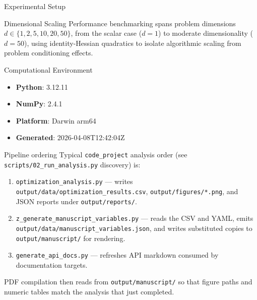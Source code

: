\documentclass[
  ignorenonframetext,
]{beamer}
\providecommand{\tightlist}{%
  \setlength{\itemsep}{0pt}\setlength{\parskip}{0pt}}
\begin{document}
\begin{frame}[fragile]{Experimental Setup}
\begin{block}{Dimensional Scaling}
\protect{}\label{dimensional-scaling}
Performance benchmarking spans problem dimensions
\(d \in \{1, 2, 5, 10, 20, 50\}\), from the scalar case (\(d = 1\)) to
moderate dimensionality (\(d = 50\)), using identity-Hessian quadratics
to isolate algorithmic scaling from problem conditioning effects.
\end{block}

\begin{block}{Computational Environment}
\protect{}\label{computational-environment}
\begin{itemize}
\tightlist
\item
  \textbf{Python}: 3.12.11
\item
  \textbf{NumPy}: 2.4.1
\item
  \textbf{Platform}: Darwin arm64
\item
  \textbf{Generated}: 2026-04-08T12:42:04Z
\end{itemize}
\end{block}

\begin{block}{Pipeline ordering}
\protect{}\label{pipeline-ordering}
Typical \texttt{code\_project} analysis order (see
\texttt{scripts/02\_run\_analysis.py} discovery) is:

\begin{enumerate}
\tightlist
\item
  \texttt{optimization\_analysis.py} --- writes
  \texttt{output/data/optimization\_results.csv},
  \texttt{output/figures/*.png}, and JSON reports under
  \texttt{output/reports/}.
\item
  \texttt{z\_generate\_manuscript\_variables.py} --- reads the CSV and
  YAML, emits \texttt{output/data/manuscript\_variables.json}, and
  writes substituted copies to \texttt{output/manuscript/} for
  rendering.
\item
  \texttt{generate\_api\_docs.py} --- refreshes API markdown consumed by
  documentation targets.
\end{enumerate}

PDF compilation then reads from \texttt{output/manuscript/} so that
figure paths and numeric tables match the analysis that just completed.
\end{block}


\end{frame}
\end{document}
